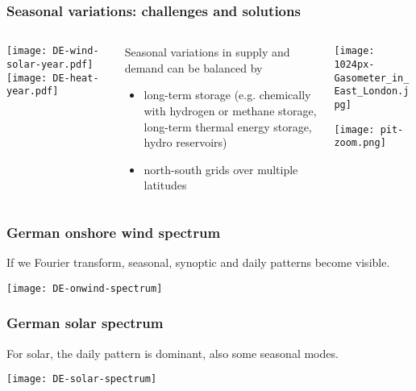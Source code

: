 \documentclass[10pt,aspectratio=169,dvipsnames]{beamer}
\let\olditem\item
\renewcommand{\item}{%
\olditem\vspace{5pt}}
\begin{document}
\begin{frame}
  \frametitle{Seasonal variations: challenges and solutions}

  \begin{columns}[T]
    \begin{column}{5cm}
      \texttt{[image: DE-wind-solar-year.pdf]}
      \texttt{[image: DE-heat-year.pdf]}
    \end{column}
    \begin{column}{4cm}
      Seasonal variations in supply and demand can be balanced by
      \begin{itemize}
      \item \alert{long-term storage} (e.g. chemically with hydrogen or methane storage, long-term thermal energy storage, hydro reservoirs)
      \item \alert{north-south grids over multiple latitudes}
      \end{itemize}

    \end{column}
    \begin{column}{5cm}
      \texttt{[image: 1024px-Gasometer\_in\_East\_London.jpg]}

      \vspace{.2cm}

      \texttt{[image: pit-zoom.png]}
    \end{column}
  \end{columns}

\end{frame}


\begin{frame}
  \frametitle{German onshore wind spectrum}

  If we Fourier transform, seasonal, synoptic and daily patterns become visible.

  \centering
  \texttt{[image: DE-onwind-spectrum]}

\end{frame}




\begin{frame}
  \frametitle{German solar spectrum}

  For solar, the daily pattern is dominant, also some seasonal modes.

  \centering
  \texttt{[image: DE-solar-spectrum]}

\end{frame}
\end{document}
